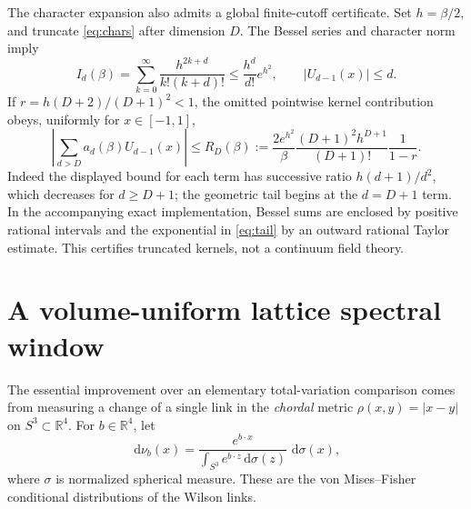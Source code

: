 \documentclass[11pt,a4paper]{article}
\numberwithin{equation}{section}
\newcommand{\dd}{\,\mathrm d}
\begin{document}
The character expansion also admits a global finite-cutoff
certificate. Set \(h=\beta/2\), and truncate
\eqref{eq:chars} after dimension \(D\).
The Bessel series and character norm imply
\begin{equation}
 I_d(\beta)
 =\sum_{k=0}^{\infty}
     \frac{h^{2k+d}}{k!(k+d)!}
 \leq\frac{h^d}{d!}e^{h^2},\qquad
 |U_{d-1}(x)|\leq d.
\end{equation}
If \(r=h(D+2)/(D+1)^2<1\), the omitted pointwise kernel
contribution obeys, uniformly for \(x\in[-1,1]\),
\begin{equation}
 \left|\sum_{d>D}a_d(\beta)U_{d-1}(x)\right|
 \leq R_D(\beta):=
 \frac{2e^{h^2}}{\beta}
 \frac{(D+1)^2h^{D+1}}{(D+1)!}\frac1{1-r}.
                                                        \label{eq:tail}
\end{equation}
Indeed the displayed bound for each term has successive ratio
\(h(d+1)/d^2\), which decreases for \(d\geq D+1\);
the geometric tail begins at the \(d=D+1\) term.
In the accompanying exact implementation, Bessel sums are
enclosed by positive rational intervals and the exponential
in \eqref{eq:tail} by an outward rational Taylor estimate.
This certifies truncated kernels, not a continuum field theory.

\section{A volume-uniform lattice spectral window}
\label{sec:gap}

The essential improvement over an elementary total-variation
comparison comes from measuring a change of a single link in the
\emph{chordal} metric
\(\rho(x,y)=|x-y|\) on \(S^3\subset\mathbb R^4\).
For \(b\in\mathbb R^4\), let
\begin{equation}
 \dd\nu_b(x)=\frac{e^{b\cdot x}}{\int_{S^3}e^{b\cdot z}
       \dd\sigma(z)}\,\dd\sigma(x),             \label{eq:vmf}
\end{equation}
where \(\sigma\) is normalized spherical measure.
These are the von Mises--Fisher conditional distributions of the
Wilson links.
\end{document}
